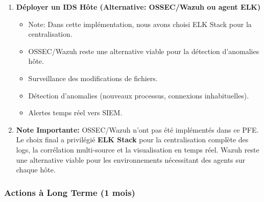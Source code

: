 \documentclass[12pt,a4paper,openany]{report}
\begin{document}
\begin{enumerate}
\begin{lstlisting}
			[telnetd]
			enabled  = true
			port     = telnet
			logpath  = /var/log/syslog
			maxretry = 2
			bantime  = -1    # Ban permanent
		\end{lstlisting}
		
		\textbf{Résultat :} Cette sortie confirme l'exécution correcte de l'action pratique dans l'environnement de laboratoire. Elle apporte des éléments vérifiables pour contrôler l'état du service, du flux ou de la configuration avant l'étape suivante. Sur le plan pédagogique, elle relie l'opération réalisée aux objectifs d'apprentissage offensive/défensive.
		
		
		\item \textbf{Déployer un IDS Hôte (Alternative: OSSEC/Wazuh ou agent ELK)}
		\begin{itemize}
			\item Note: Dans cette implémentation, nous avons choisi ELK Stack pour la centralisation.
			\item OSSEC/Wazuh reste une alternative viable pour la détection d'anomalies hôte.
			\item Surveillance des modifications de fichiers.
			\item Détection d'anomalies (nouveaux processus, connexions inhabituelles).
			\item Alertes temps réel vers SIEM.
		\end{itemize}
		
		\item \textbf{Note Importante:} OSSEC/Wazuh n'ont pas été implémentés dans ce PFE.
		Le choix final a privilégié \textbf{ELK Stack} pour la centralisation complète
		des logs, la corrélation multi-source et la visualisation en temps réel.
		Wazuh reste une alternative viable pour les environnements nécessitant
		des agents sur chaque hôte.
	\end{enumerate}
	
	\subsubsection{Actions à Long Terme (1 mois)}
	
\end{document}
